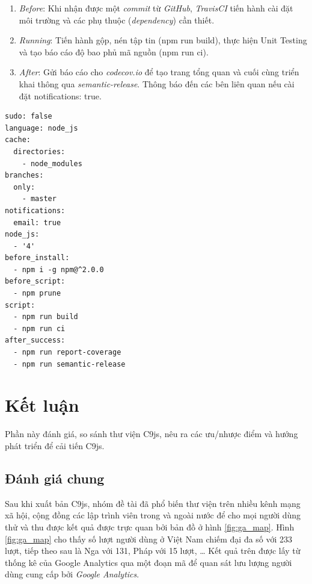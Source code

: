 \documentclass[12pt,a4paper,twoside]{article}
\newcommand*\NewPage{\newpage\null\thispagestyle{empty}\newpage}
\begin{document}
\begin{enumerate}
\item \emph{Before}: Khi nhận được một \textit{commit} từ \textit{GitHub}, \textit{TravisCI} tiến hành cài đặt môi trường và các phụ thuộc (\textit{dependency}) cần thiết.
\item \emph{Running}: Tiến hành gộp, nén tập tin (\textsf{npm run build}), thực hiện Unit Testing và tạo báo cáo độ bao phủ mã nguồn (\textsf{npm run ci}).
\item \emph{After}: Gửi báo cáo cho \textit{codecov.io} để tạo trang tổng quan và cuối cùng triển khai thông qua \textit{semantic-release}. Thông báo đến các bên liên quan nếu cài đặt \textsf{notifications: true}.
\end{enumerate}

\begin{lstlisting}[caption=Cấu hình TravisCI kiểm soát cả 3 giai đoạn,label={code:travisci}]
sudo: false
language: node_js
cache:
  directories:
    - node_modules
branches:
  only:
    - master
notifications:
  email: true
node_js:
  - '4'
before_install:
  - npm i -g npm@^2.0.0
before_script:
  - npm prune
script:
  - npm run build
  - npm run ci
after_success:
  - npm run report-coverage
  - npm run semantic-release
\end{lstlisting}

\clearpage
\NewPage
\section{Kết luận}
Phần này đánh giá, so sánh thư viện C9js, nêu ra các ưu/nhược điểm và hướng phát triển để cải tiến C9js.
\subsection{Đánh giá chung}\label{sec:eval}
Sau khi xuất bản C9js, nhóm đề tài đã phổ biến thư viện trên nhiều kênh mạng xã hội, cộng đồng các lập trình viên trong và ngoài nước để cho mọi người dùng thử và thu được kết quả được trực quan bởi bản đồ ở hình \ref{fig:ga_map}. Hình \ref{fig:ga_map} cho thấy số lượt người dùng ở Việt Nam chiếm đại đa số với 233 lượt, tiếp theo sau là Nga với 131, Pháp với 15 lượt, … Kết quả trên được lấy từ thống kê của Google Analytics qua một đoạn mã để quan sát lưu lượng người dùng cung cấp bởi \textit{Google Analytics}\cite{ga_c9js}.
\end{document}
